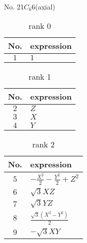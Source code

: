 \documentclass[fleqn,8pt,landscape]{jsarticle}
\begin{document}
\setcounter{MaxMatrixCols}{16}

\begin{center}
\LARGE
No. 21\quad$C_{6}$\quad$6$\quad[ hexagonal ] (axial)
\end{center}
\begin{table}[ht!]
\begin{center}
\caption{rank 0}
\renewcommand{\arraystretch}{1.3}
\begin{tabular}{cl} \hline \hline
No. & expression \\ \hline
$ 1 $ & $ 1 $ \\
 \hline \hline
\end{tabular}
\end{center}
\end{table}
\begin{table}[ht!]
\begin{center}
\caption{rank 1}
\renewcommand{\arraystretch}{1.3}
\begin{tabular}{cl} \hline \hline
No. & expression \\ \hline
$ 2 $ & $ Z $ \\
$ 3 $ & $ X $ \\
$ 4 $ & $ Y $ \\
 \hline \hline
\end{tabular}
\end{center}
\end{table}
\begin{table}[ht!]
\begin{center}
\caption{rank 2}
\renewcommand{\arraystretch}{1.3}
\begin{tabular}{cl} \hline \hline
No. & expression \\ \hline
$ 5 $ & $ - \frac{X^{2}}{2} - \frac{Y^{2}}{2} + Z^{2} $ \\
$ 6 $ & $ \sqrt{3} X Z $ \\
$ 7 $ & $ \sqrt{3} Y Z $ \\
$ 8 $ & $ \frac{\sqrt{3} \left(X^{2} - Y^{2}\right)}{2} $ \\
$ 9 $ & $ - \sqrt{3} X Y $ \\
 \hline \hline
\end{tabular}
\end{center}
\end{table}
\end{document}
